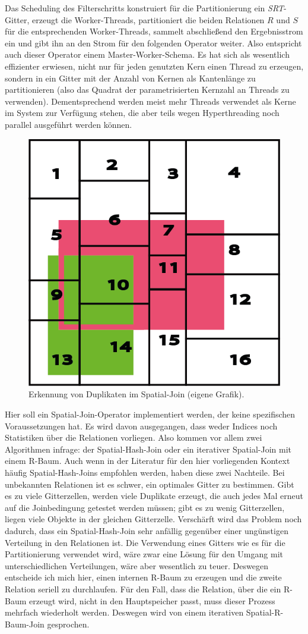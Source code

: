 \documentclass[a4paper,12pt,twoside]{article}
\newcommand{\Fb}[1]{\textit{#1}} %
\begin{document}
Das Scheduling des Filterschritts konstruiert für die Partitionierung ein \Fb{SRT}-Gitter, erzeugt die Worker-Threads, partitioniert die beiden Relationen $R$ und $S$ für die entsprechenden Worker-Threads, sammelt abschließend den Ergebnisstrom ein und gibt ihn an den Strom für den folgenden Operator weiter. Also entspricht auch dieser Operator einem Master-Worker-Schema. Es hat sich als wesentlich effizienter erwiesen, nicht nur für jeden genutzten Kern einen Thread zu erzeugen, sondern in ein Gitter mit der Anzahl von Kernen als Kantenlänge zu partitionieren (also das Quadrat der parametrisierten Kernzahl an Threads zu verwenden). Dementsprechend werden meist mehr Threads verwendet als Kerne im System zur Verfügung stehen, die aber teils wegen Hyperthreading noch parallel ausgeführt werden können.

\begin{figure}
	\centering
	\includegraphics[width=0.4\linewidth]{Bilder/duplikat.png}
	\caption{Erkennung von Duplikaten im Spatial-Join (eigene Grafik).}
	\label{img:sjDup}
\end{figure}

Hier soll ein Spatial-Join-Operator implementiert werden, der keine spezifischen Voraussetzungen hat. Es wird davon ausgegangen, dass weder Indices noch Statistiken über die Relationen vorliegen. Also kommen vor allem zwei Algorithmen infrage: der Spatial-Hash-Join oder ein iterativer Spatial-Join mit einem R-Baum. Auch wenn in der Literatur für den hier vorliegenden Kontext häufig Spatial-Hash-Joins empfohlen werden, haben diese zwei Nachteile. Bei unbekannten Relationen ist es schwer, ein optimales Gitter zu bestimmen. Gibt es zu viele Gitterzellen, werden viele Duplikate erzeugt, die auch jedes Mal erneut auf die Joinbedingung getestet werden müssen;  gibt es zu wenig Gitterzellen, liegen viele Objekte in der gleichen Gitterzelle. Verschärft wird das Problem noch dadurch, dass ein Spatial-Hash-Join sehr anfällig gegenüber einer ungünstigen Verteilung in den Relationen ist. Die Verwendung eines Gitters wie es für die Partitionierung verwendet wird, wäre zwar eine Lösung für den Umgang mit unterschiedlichen Verteilungen, wäre aber wesentlich zu teuer. Deswegen entscheide ich mich hier, einen internen R-Baum zu erzeugen und die zweite Relation seriell zu durchlaufen. Für den Fall, dass die Relation, über die ein R-Baum erzeugt wird, nicht in den Hauptspeicher passt, muss dieser Prozess mehrfach wiederholt werden. Deswegen wird von einem iterativen Spatial-R-Baum-Join gesprochen.
\end{document}
